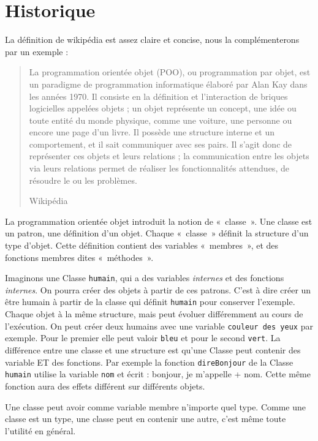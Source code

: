 
  \label{DefPOO}
  \section{Historique}
  	La définition de wikipédia est assez claire et concise, nous la complémenterons par un exemple : 
  	\begin{quotation}
  		La programmation orientée objet (POO), ou programmation par objet, est un paradigme de programmation informatique élaboré par Alan Kay dans les années 1970. Il consiste en la définition et l'interaction de briques logicielles appelées objets ; un objet représente un concept, une idée ou toute entité du monde physique, comme une voiture, une personne ou encore une page d'un livre. Il possède une structure interne et un comportement, et il sait communiquer avec ses pairs. Il s'agit donc de représenter ces objets et leurs relations ; la communication entre les objets via leurs relations permet de réaliser les fonctionnalités attendues, de résoudre le ou les problèmes.
  		\begin{flushright}
  			Wikipédia
  		\end{flushright}
  	\end{quotation}

    La programmation orientée objet introduit la notion de «~classe~». Une classe est 
    un patron, une définition d'un objet. Chaque «~classe~» définit la structure d'un type
    d'objet. Cette définition contient des variables «~membres~», et des fonctions membres dites «~méthodes~».
    
    Imaginons une Classe \texttt{humain}, qui a des variables \textit{internes} et
    des fonctions \textit{internes}. On pourra créer des objets à partir de ces patrons. C'est à dire 
    créer un être humain à partir de la classe qui définit \texttt{humain} pour conserver l'exemple. Chaque objet 
    à la même structure, mais peut évoluer différemment au cours de l’exécution. On peut créer
    deux humains avec une variable \texttt{couleur des yeux} par exemple. Pour le premier elle peut valoir \texttt{bleu} et pour le second \texttt{vert}. La différence entre une classe et une structure est qu'une Classe 
    peut contenir des variable ET des fonctions. Par exemple la fonction \texttt{direBonjour} de la 
    Classe \texttt{humain} utilise la variable \texttt{nom} et écrit : bonjour, je m'appelle + nom.
    Cette même fonction aura des effets différent sur différents objets.
    
    Une classe peut avoir comme variable membre n'importe quel type. Comme une classe est un type, une classe peut en contenir une autre, c'est même toute l'utilité en général.
